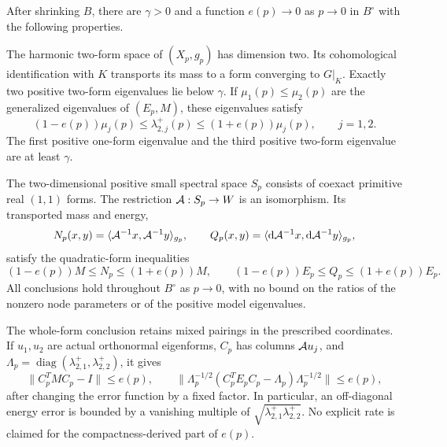 \begin{theorem}\label{thm:main}
After shrinking $B$, there are $\gamma>0$ and a function $e(p)\to0$
as $p\to0$ in $B^\circ$ with the following properties.

The harmonic two-form space of $(X_p,g_p)$ has dimension two. Its
cohomological identification with $K$ transports its mass to a form
converging to $G|_K$. Exactly two positive two-form eigenvalues lie below
$\gamma$. If $\mu_1(p)\le\mu_2(p)$ are the generalized eigenvalues
of $(E_p,M)$, these eigenvalues satisfy
\begin{equation}\label{eq:main-rates}
 (1-e(p))\mu_j(p)\le\lambda_{2,j}^+(p)
                 \le(1+e(p))\mu_j(p),\qquad j=1,2.
\end{equation}
The first positive one-form eigenvalue and the third positive two-form
eigenvalue are at least $\gamma$.

The two-dimensional positive small spectral space $S_p$ consists of
coexact primitive real $(1,1)$ forms. The restriction $\mathcal A:S_p\to W$
is an isomorphism. Its transported mass and energy,
\begin{equation}\label{eq:observed-pair-intro}
 N_p(x,y)=\langle\mathcal A^{-1}x,\mathcal A^{-1}y\rangle_{g_p},\qquad
 Q_p(x,y)=\langle\mathrm d\mathcal A^{-1}x,\mathrm d\mathcal A^{-1}y\rangle_{g_p},
\end{equation}
satisfy the quadratic-form inequalities
\begin{equation}\label{eq:main-forms}
 (1-e(p))M\le N_p\le(1+e(p))M,\qquad
 (1-e(p))E_p\le Q_p\le(1+e(p))E_p.
\end{equation}
All conclusions hold throughout $B^\circ$ as $p\to0$, with no bound
on the ratios of the nonzero node parameters or of the positive model
eigenvalues.
\end{theorem}

The whole-form conclusion retains mixed pairings in the prescribed
coordinates. If $u_1,u_2$ are actual orthonormal eigenforms, $C_p$ has
columns $\mathcal A u_j$, and $\Lambda_p=\operatorname{diag}
(\lambda_{2,1}^+,\lambda_{2,2}^+)$, it gives
\begin{equation}\label{eq:marked-matrix-intro}
 \|C_p^TMC_p-I\|\le e(p),\qquad
 \|\Lambda_p^{-1/2}(C_p^TE_pC_p-\Lambda_p)
                          \Lambda_p^{-1/2}\|\le e(p),
\end{equation}
after changing the error function by a fixed factor. In particular, an
off-diagonal energy error is bounded by a vanishing multiple of
$\sqrt{\lambda_{2,1}^+\lambda_{2,2}^+}$. No explicit rate is claimed
for the compactness-derived part of $e(p)$.

